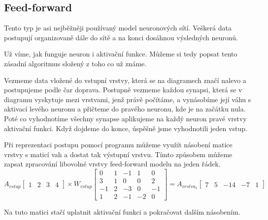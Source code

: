 \documentclass[12pt,a4paper]{report}
\begin{document}
		\subsection{Feed-forward}
		Tento typ je asi nejběžněji používaný model neuronových sítí. Veškerá data postupují organizovaně dále do sítě a na konci dosáhnou výsledných neuronů.
		
		Už víme, jak funguje neuron i aktivační funkce. Můžeme si tedy popsat tento zásadní algoritmus složený z toho co už známe.
		
		Vezmeme data vložené do vstupní vrstvy, která se na diagramech značí nalevo a postupujeme podle čar doprava. Postupně vezmeme každou synapsi, která se v diagramu vyskytuje mezi vrstvami, jenž právě počítáme, a vynásobíme její váhu s aktivací levého neuronu a přičteme do pravého neuronu, kde je na začátku nula. Poté co vyhodnotíme všechny synapse aplikujeme na každý neuron pravé vrstvy aktivační funkci. Když dojdeme do konce, úspěšně jsme vyhodnotili jeden vstup.
		
		Při reprezentaci postupu pomocí programu můžeme využít násobení matice vrstvy s maticí vah a dostat tak výstupní vrstvu. Tímto způsobem můžeme zapsat zpracování libovolné vrstvy feed-forward modelu na jeden řádek.
		$$
		A_{vstup}
		\begin{bmatrix}
		1 & 2 & 3 & 4
		\end{bmatrix}
		\times
		W_{vstup}
		\begin{bmatrix}
		0  & 1 & -1 & 1  & 0  \\
		3  & 1 & 0  & 0  & 2  \\
		-1 & 2 & -3 & 0  & -1 \\
		1  & 2 & -1 & -2 & 0 
		\end{bmatrix}
		=
		A_{vrstva_1}
		\begin{bmatrix}
		7 & 5 & -14 & -7 & 1
		\end{bmatrix}
		$$
		
		Na tuto matici stačí uplatnit aktivační funkci a pokračovat dalším násobením.
		
\end{document}
